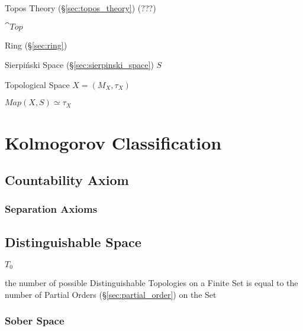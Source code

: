 Topos Theory (\S\ref{sec:topos_theory}) (???)

$\cat{Top}$

Ring (\S\ref{sec:ring})

Sierpi\'nski Space (\S\ref{sec:sierpinski_space}) $S$

Topological Space $X = (M_X,\tau_X)$

$Map(X,S) \simeq \tau_X$



\section{Kolmogorov Classification}\label{sec:kolmogorov_classification}

\subsection{Countability Axiom}\label{sec:countability_axiom}

\subsubsection{Separation Axioms}\label{sec:separation_axioms}



\subsection{Distinguishable Space}\label{sec:distinguishable_space}

$\xspace{T}_0$

the number of possible Distinguishable Topologies on a Finite Set is equal to
the number of Partial Orders (\S\ref{sec:partial_order}) on the Set



\subsubsection{Sober Space}\label{sec:sober_space}

